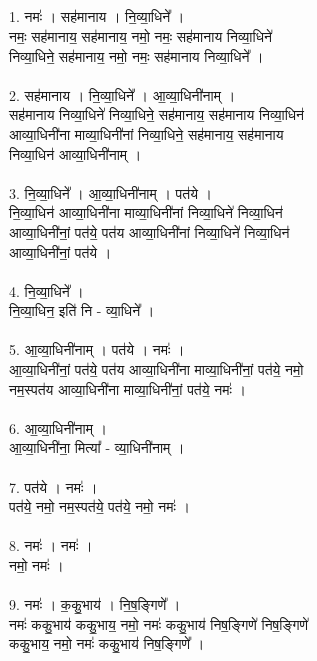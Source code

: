 \subsection{}
1. नमः॑ । सह॑मानाय । नि॒व्या॒धिने᳚ ।\\
नमः॒ सह॑मानाय॒ सह॑मानाय॒ नमो॒ नमः॒ सह॑मानाय निव्या॒धिने॑\\
निव्या॒धिने॒ सह॑मानाय॒ नमो॒ नमः॒ सह॑मानाय निव्या॒धिने᳚ ।\\
\\
2. सह॑मानाय । नि॒व्या॒धिने᳚ । आ॒व्या॒धिनी॑नाम् ।\\
सह॑मानाय निव्या॒धिने॑ निव्या॒धिने॒ सह॑मानाय॒ सह॑मानाय निव्या॒धिन॑\\
आव्या॒धिनी॑ना माव्या॒धिनी॑नां निव्या॒धिने॒ सह॑मानाय॒ सह॑मानाय\\
निव्या॒धिन॑ आव्या॒धिनी॑नाम् ।\\
\\
3. नि॒व्या॒धिने᳚ । आ॒व्या॒धिनी॑नाम् । पत॑ये ।\\
नि॒व्या॒धिन॑ आव्या॒धिनी॑ना माव्या॒धिनी॑नां निव्या॒धिने॑ निव्या॒धिन॑\\
आव्या॒धिनी॑नां॒ पत॑ये॒ पत॑य आव्या॒धिनी॑नां निव्या॒धिने॑ निव्या॒धिन॑\\
आव्या॒धिनी॑नां॒ पत॑ये ।\\
\\
4. नि॒व्या॒धिने᳚ ।\\
नि॒व्या॒धिन॒ इति॑ नि - व्या॒धिने᳚ ।\\
\\
5. आ॒व्या॒धिनी॑नाम् । पत॑ये । नमः॑ ।\\
आ॒व्या॒धिनी॑नां॒ पत॑ये॒ पत॑य आव्या॒धिनी॑ना माव्या॒धिनी॑नां॒ पत॑ये॒ नमो॒\\
नम॒स्पत॑य आव्या॒धिनी॑ना माव्या॒धिनी॑नां॒ पत॑ये॒ नमः॑ ।\\
\\
6. आ॒व्या॒धिनी॑नाम् ।\\
आ॒व्या॒धिनी॑ना॒ मित्या᳚ - व्या॒धिनी॑नाम् ।\\
\\
7. पत॑ये । नमः॑ ।\\
पत॑ये॒ नमो॒ नम॒स्पत॑ये॒ पत॑ये॒ नमो॒ नमः॑ ।\\
\\
8. नमः॑ । नमः॑ ।\\
नमो॒ नमः॑ ।\\
\\
9. नमः॑ । क॒कु॒भाय॑ । नि॒ष॒ङ्गिणे᳚ ।\\
नमः॑ ककु॒भाय॑ ककु॒भाय॒ नमो॒ नमः॑ ककु॒भाय॑ निष॒ङ्गिणे॑ निष॒ङ्गिणे॑\\
ककु॒भाय॒ नमो॒ नमः॑ ककु॒भाय॑ निष॒ङ्गिणे᳚ ।\\
